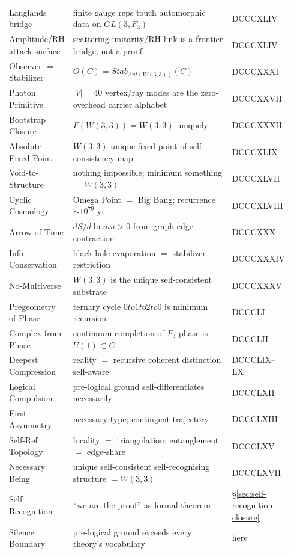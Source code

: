 \documentclass[11pt]{article}
\def\mathbb#1{#1}%
\def\mathrm#1{#1}%
\def\mathcal#1{#1}%
\def\mu{mu}%
\def\to{ to }%
\begin{document}
{\begin{longtable}{>{\raggedright\arraybackslash}p{0.18\linewidth} >{\raggedright\arraybackslash}p{0.63\linewidth} >{\raggedright\arraybackslash}p{0.13\linewidth}}
Langlands bridge & finite gauge reps touch automorphic data on $GL(3,\mathbb{F}_3)$ & DCCCXLIV \\
Amplitude/RH attack surface & scattering-unitarity/RH link is a frontier bridge, not a proof & DCCCXLIV \\
Observer $=$ Stabilizer & $\mathcal{O}(\mathcal{C}) = \mathrm{Stab}_{\mathrm{Aut}(W(3,3))}(\mathcal{C})$ & DCCCXXXI \\
Photon Primitive & $|V|=40$ vertex/ray modes are the zero-overhead carrier alphabet & DCCCXXVII \\
Bootstrap Closure & $\mathcal{F}(W(3,3))=W(3,3)$ uniquely & DCCCXXXII \\
Absolute Fixed Point & $W(3,3)$ unique fixed point of self-consistency map & DCCCXLIX \\
Void-to-Structure & nothing impossible; minimum something $=W(3,3)$ & DCCCXLVII \\
Cyclic Cosmology & Omega Point $=$ Big Bang; recurrence $\sim 10^{79}$ yr & DCCCXLVIII \\
Arrow of Time & $dS/d\ln\mu>0$ from graph edge-contraction & DCCCXXX \\
Info Conservation & black-hole evaporation $=$ stabilizer restriction & DCCCXXXIV \\
No-Multiverse & $W(3,3)$ is the unique self-consistent substrate & DCCCXXXV \\
Pregeometry of Phase & ternary cycle $0\to1\to2\to0$ is minimum recursion & DCCCLI \\
Complex from Phase & continuum completion of $\mathbb{F}_3$-phase is $U(1)\subset\mathbb{C}$ & DCCCLII \\
Deepest Compression & reality $=$ recursive coherent distinction self-aware & DCCCLIX--LX \\
Logical Compulsion & pre-logical ground self-differentiates necessarily & DCCCLXII \\
First Asymmetry & necessary type; contingent trajectory & DCCCLXIII \\
Self-Ref Topology & locality $=$ triangulation; entanglement $=$ edge-share & DCCCLXV \\
Necessary Being & unique self-consistent self-recognising structure $=W(3,3)$ & DCCCLXVII \\
Self-Recognition & ``we are the proof'' as formal theorem & \S\ref{sec:self-recognition-closure} \\
Silence Boundary & pre-logical ground exceeds every theory's vocabulary & here \\

\end{longtable}}
\end{document}
